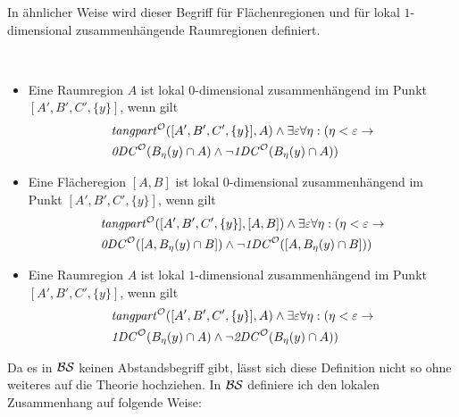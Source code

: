     In ähnlicher Weise wird dieser Begriff für Flächenregionen und für lokal $1$-dimensional zusammenhängende Raumregionen definiert.

    \begin{dfn}\ \vspace{0pt}

        \begin{itemize}
            \item Eine Raumregion $A$ ist lokal $0$-dimensional zusammenhängend im Punkt $[A', B', C', \{y\}]$, wenn gilt
            \begin{align*}
                &\mathit{tangpart}^\mathcal{O}([A', B', C', \{y\}],A) \land \exists \varepsilon \forall \eta: (\eta < \varepsilon \to 
                \\
                &\mathit{0DC}^\mathcal{O}(B_{\eta}(y) \cap A) \land \neg \mathit{1DC}^\mathcal{O}(B_{\eta}(y) \cap A))
            \end{align*}
            \item Eine Flächeregion $[A,B]$ ist lokal $0$-dimensional zusammenhängend im Punkt $[A', B', C', \{y\}]$, wenn gilt
            \begin{align*}
                &\mathit{tangpart}^\mathcal{O}([A', B', C', \{y\}],[A,B]) \land \exists \varepsilon \forall \eta:
                (\eta < \varepsilon \to
                \\
                &\mathit{0DC}^\mathcal{O}([A,B_{\eta}(y) \cap B]) \land \neg \mathit{1DC}^\mathcal{O}([A,B_{\eta}(y) \cap B]))
            \end{align*}
            \item Eine Raumregion $A$ ist lokal $1$-dimensional zusammenhängend im Punkt $[A', B', C', \{y\}]$, wenn gilt
            \begin{align*}
                &\mathit{tangpart}^\mathcal{O}([A', B', C', \{y\}],A) \land \exists \varepsilon \forall \eta: (\eta < \varepsilon \to 
                \\
                &\mathit{1DC}^\mathcal{O}(B_{\eta}(y) \cap A) \land \neg \mathit{2DC}^\mathcal{O}(B_{\eta}(y) \cap A))
            \end{align*}
        \end{itemize}
        
    \end{dfn}
%     
    Da es in $\mathcal{BS}$ keinen Abstandsbegriff gibt, lässt sich diese Definition nicht so ohne weiteres auf die Theorie hochziehen. 
    In $\mathcal{BS}$ definiere ich den lokalen Zusammenhang auf folgende Weise:
%
